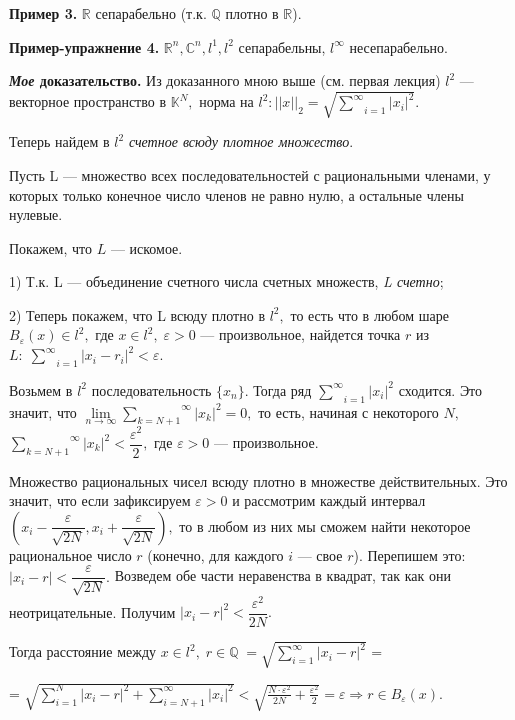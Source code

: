 \documentclass[12pt,a4paper]{article}
\begin{document}
\textbf{Пример 3.} $\mathbb{R}$ сепарабельно (т.к. $\mathbb{Q}$ плотно в $\mathbb{R}$). 

\textbf{Пример-упражнение 4.} $\mathbb{R}^n, \mathbb{C}^n, l^{1}, l^{2}$ сепарабельны, $l^{\infty}$ несепарабельно. 

\textbf{\textit{Мое} доказательство.} Из доказанного мною выше (см. первая лекция) $l^{2}$ --- векторное пространство в $\mathbb{K}^{N},$ норма на $l^2\!\!: ||x||_{2} = \sqrt{\underset{i = 1}{\overset{\infty}{\sum}}|x_{i}|^2}.$ 

Теперь найдем в $l^{2}$ \textit{счетное всюду плотное множество}. 

Пусть L --- множество всех последовательностей с рациональными членами, у которых только конечное число членов не равно нулю, а остальные члены нулевые. 

Покажем, что $L$ --- искомое. 

1) Т.к. L --- объединение счетного числа счетных множеств, \textit{L счетно};

2) Теперь покажем, что L всюду плотно в $l^{2},$ то есть что в любом шаре $B_{\varepsilon}(x) \in l^{2},$ где $x \in l^{2}, \; \varepsilon > 0$ --- произвольное, найдется точка $r$ из $L: \; \underset{i = 1}{\overset{\infty}{\sum}}|x_{i} - r_{i}|^2 < \varepsilon.$ 

Возьмем в $l^{2}$ последовательность $\{x_{n}\}.$ Тогда ряд $\underset{i = 1}{\overset{\infty}{\sum}}|x_{i}|^2$ сходится. Это значит, что $\underset{n \to \infty}{\lim} \overset{\infty}{\underset{k = N + 1}{\sum}}|x_{k}|^{2} = 0,$ то есть, начиная с некоторого $N,$ $\overset{\infty}{\underset{k = N + 1}{\sum}}|x_{k}|^{2} < \dfrac{\varepsilon^{2}}{2},$ где $\varepsilon > 0$ --- произвольное. 

Множество рациональных чисел всюду плотно в множестве действительных. Это значит, что если зафиксируем $\varepsilon > 0$ и рассмотрим каждый интервал $(x_{i} - \dfrac{\varepsilon}{\sqrt{2N}}, x_{i} + \dfrac{\varepsilon}{\sqrt{2N}}),$ то в любом из них мы сможем найти некоторое рациональное число $r$ (конечно, для каждого $i$ --- свое $r$). Перепишем это: $|x_{i} - r| < \dfrac{\varepsilon}{\sqrt{2N}}.$ Возведем обе части неравенства в квадрат, так как они неотрицательные. Получим $|x_{i} - r|^{2} < \dfrac{\varepsilon^{2}}{2N}.$

Тогда расстояние между $x \in l^{2}, \; r \in \mathbb{Q} \; = \sqrt{\sum\limits_{i = 1}^{\infty} |x_{i} - r|^{2}}$ = 

= $\sqrt{\sum\limits_{i = 1}^{N} |x_{i} - r|^{2} + \sum\limits_{i = N + 1}^{\infty} |x_{i}|^{2}} < \sqrt{\frac {N \cdot \varepsilon^{2}}{2N} + \frac {\varepsilon^{2}}{2}} = \varepsilon \Rightarrow r \in B_{\varepsilon}(x).$
\end{document}
